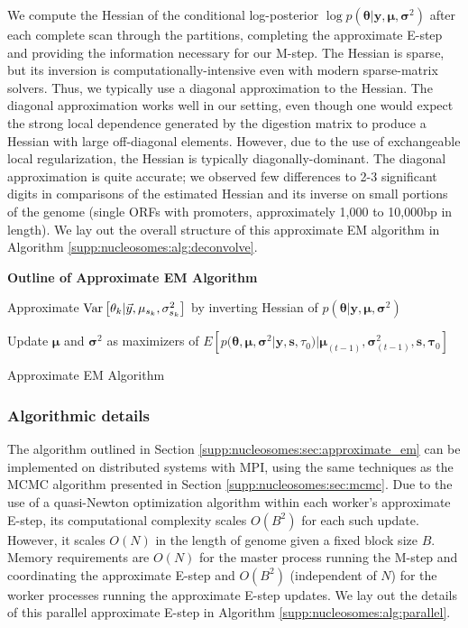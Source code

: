 We compute the Hessian of the conditional log-posterior $\log p(\bm \theta | \bm y, \bm \mu, \bm \sigma^2 )$ after each complete scan through the partitions, completing the approximate E-step and providing the information necessary for our M-step.
The Hessian is sparse, but its inversion is computationally-intensive even with modern sparse-matrix solvers.
Thus, we typically use a diagonal approximation to the Hessian.
The diagonal approximation works well in our setting, even though one would expect the strong local dependence generated by the digestion matrix to produce a Hessian with large off-diagonal elements.
However, due to the use of exchangeable local regularization, the Hessian is typically diagonally-dominant.
The diagonal approximation is quite accurate; we observed few differences to 2-3 significant digits in comparisons of the estimated Hessian and its inverse on small portions of the genome (single ORFs with promoters, approximately 1,000 to 10,000bp in length).
%
We lay out the overall structure of this approximate EM algorithm in Algorithm \ref{supp:nucleosomes:alg:deconvolve}.

\begin{algorithm}%
\hspace{-8pt} \textbf{Outline of Approximate EM Algorithm} \\
  {
  Approximate $\operatorname{Var} \left[ \theta_k | \vec y, \mu_{s_k}, \sigma^2_{s_k}
    \right]$ by inverting Hessian of $p(\bm \theta | \bm y, \bm \mu, \bm
    \sigma^2 )$
  
  Update $\bm \mu$ and $\bm \sigma^2$ as maximizers of $E \left[ p(\bm \theta,
    \bm \mu, \bm \sigma^2 | \bm y, \bm s, \tau_0) | \bm \mu_{(t-1)}, \bm
    \sigma^2_{(t-1)}, \bm s, \bm \tau_0 \right]$
 }
 \caption{Approximate EM Algorithm \label{supp:nucleosomes:alg:deconvolve}}
\end{algorithm}

\subsubsection{Algorithmic details}
\label{supp:nucleosomes:sec:mpi}

The algorithm outlined in Section \ref{supp:nucleosomes:sec:approximate_em} can be implemented on distributed systems with MPI, using the same techniques as the MCMC algorithm presented in Section \ref{supp:nucleosomes:sec:mcmc}.
Due to the use of a quasi-Newton optimization algorithm within each worker's approximate E-step, its computational complexity scales $O(B^2)$ for each such update.
However, it scales $O(N)$ in the length of genome given a fixed block size $B$.
Memory requirements are $O(N)$ for the master process running the M-step and coordinating the approximate E-step and $O(B^2)$ (independent of $N$) for the worker processes running the approximate E-step updates.
We lay out the details of this parallel approximate E-step in Algorithm \ref{supp:nucleosomes:alg:parallel}.

